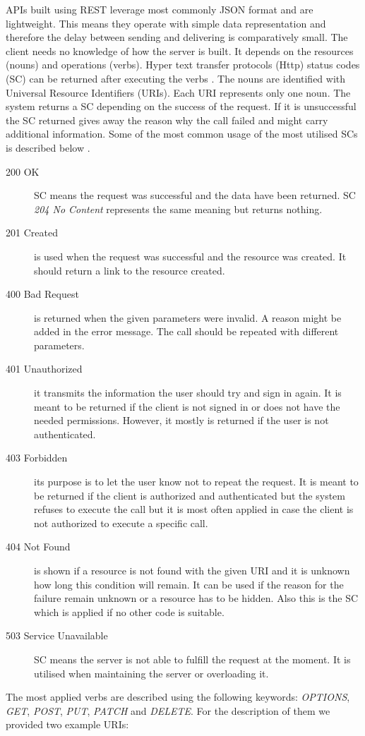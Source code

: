 APIs built using REST leverage most commonly JSON format and are lightweight. This means they operate with simple data representation and therefore the delay between sending and delivering is comparatively small. The client needs no knowledge of how the server is built. It depends on the resources (nouns) and operations (verbs). Hyper text transfer protocols (Http) status codes (SC) can be returned after executing the verbs \cite{rfc-2616}. The nouns are identified with Universal Resource Identifiers (URIs). Each URI represents only one noun. The system returns a SC depending on the success of the request. If it is unsuccessful the SC returned gives away the reason why the call failed and might carry additional information. Some of the most common usage of the most utilised SCs is described below \cite{httpmethods}.
\begin {description}
\item [200 OK] SC means the request was successful and the data have been returned. SC \textit{204 No Content} represents the same meaning but returns nothing.
\item [201 Created] is used when the request was successful and the resource was created. It should return a link to the resource created.
\item [400 Bad Request] is returned when the given parameters were invalid. A reason might be added in the error message. The call should be repeated with different parameters.
\item [401 Unauthorized] it transmits the information the user should try and sign in again. It is meant to be returned if the client is not signed in or does not have the needed permissions. However, it mostly is returned if the user is not authenticated.
\item [403 Forbidden] its purpose is to let the user know not to repeat the request. It is meant to be returned if the client is authorized and authenticated but the system refuses to execute the call but it is most often applied in case the client is not authorized to execute a specific call.
\item [404 Not Found] is shown if a resource is not found with the given URI and it is unknown how long this condition will remain. It can be used if the reason for the failure remain unknown or a resource has to be hidden. Also this is the SC which is applied if no other code is suitable.
\item [503 Service Unavailable] SC means the server is not able to fulfill the request at the moment. It is utilised when maintaining the server or overloading it.
\end{description}	
The most applied verbs are described using the following keywords: \textit{OPTIONS}, \textit{GET}, \textit{POST}, \textit{PUT}, \textit{PATCH} and \textit{DELETE}. For the description of them we provided two example URIs:

